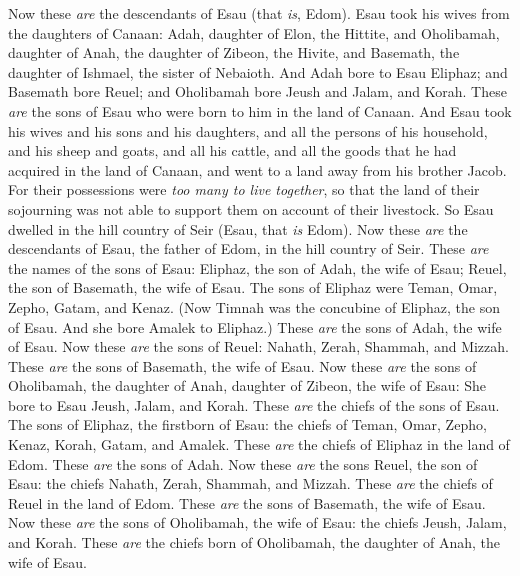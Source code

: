 \begin{biblechapter} %
 Now these \textit{are} the descendants of Esau (that \textit{is}, Edom).
\verse Esau took his wives from the daughters of Canaan: Adah, daughter of Elon, the Hittite, and Oholibamah, daughter of Anah, the daughter of Zibeon, the Hivite,
\verse and Basemath, the daughter of Ishmael, the sister of Nebaioth.
\verse And Adah bore to Esau Eliphaz; and Basemath bore Reuel;
\verse and Oholibamah bore Jeush and Jalam, and Korah. These \textit{are} the sons of Esau who were born to him in the land of Canaan.
\verse And Esau took his wives and his sons and his daughters, and all the persons of his household, and his sheep and goats, and all his cattle, and all the goods that he had acquired in the land of Canaan, and went to a land away from his brother Jacob.
\verse For their possessions were \textit{too many to live together}, so that the land of their sojourning was not able to support them on account of their livestock.
\verse So Esau dwelled in the hill country of Seir (Esau, that \textit{is} Edom).
\verse Now these \textit{are} the descendants of Esau, the father of Edom, in the hill country of Seir.
\verse These \textit{are} the names of the sons of Esau: Eliphaz, the son of Adah, the wife of Esau; Reuel, the son of Basemath, the wife of Esau.
\verse The sons of Eliphaz were Teman, Omar, Zepho, Gatam, and Kenaz.
\verse (Now Timnah was the concubine of Eliphaz, the son of Esau. And she bore Amalek to Eliphaz.) These \textit{are} the sons of Adah, the wife of Esau.
\verse Now these \textit{are} the sons of Reuel: Nahath, Zerah, Shammah, and Mizzah. These \textit{are} the sons of Basemath, the wife of Esau.
\verse Now these \textit{are} the sons of Oholibamah, the daughter of Anah, daughter of Zibeon, the wife of Esau: She bore to Esau Jeush, Jalam, and Korah.
\verse These \textit{are} the chiefs of the sons of Esau. The sons of Eliphaz, the firstborn of Esau: the chiefs of Teman, Omar, Zepho, Kenaz,
\verse Korah, Gatam, and Amalek. These \textit{are} the chiefs of Eliphaz in the land of Edom. These \textit{are} the sons of Adah.
\verse Now these \textit{are} the sons Reuel, the son of Esau: the chiefs Nahath, Zerah, Shammah, and Mizzah. These \textit{are} the chiefs of Reuel in the land of Edom. These \textit{are} the sons of Basemath, the wife of Esau.
\verse Now these \textit{are} the sons of Oholibamah, the wife of Esau: the chiefs Jeush, Jalam, and Korah. These \textit{are} the chiefs born of Oholibamah, the daughter of Anah, the wife of Esau.

\end{biblechapter}
